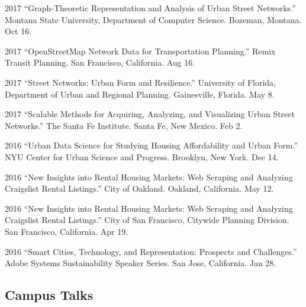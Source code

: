 \documentclass[12pt,letterpaper]{report}
\begin{document}
\begin{tablist}
        \item[2017] \tab \enquote{Graph-Theoretic Representation and Analysis of Urban Street Networks.} Montana State University, Department of Computer Science. Bozeman, Montana. Oct 16.

        \item[2017] \tab \enquote{OpenStreetMap Network Data for Transportation Planning.} Remix Transit Planning. San Francisco, California. Aug 16.

        \item[2017] \tab \enquote{Street Networks: Urban Form and Resilience.} University of Florida, Department of Urban and Regional Planning. Gainesville, Florida. May 8.

        \item[2017] \tab \enquote{Scalable Methods for Acquiring, Analyzing, and Visualizing Urban Street Networks.} The Santa Fe Institute. Santa Fe, New Mexico. Feb 2.

        \item[2016] \tab \enquote{Urban Data Science for Studying Housing Affordability and Urban Form.} NYU Center for Urban Science and Progress. Brooklyn, New York. Dec 14.

        \item[2016] \tab \enquote{New Insights into Rental Housing Markets: Web Scraping and Analyzing Craigslist Rental Listings.} City of Oakland. Oakland, California. May 12.

        \item[2016] \tab \enquote{New Insights into Rental Housing Markets: Web Scraping and Analyzing Craigslist Rental Listings.} City of San Francisco, Citywide Planning Division. San Francisco, California. Apr 19.

        \item[2016] \tab \enquote{Smart Cities, Technology, and Representation: Prospects and Challenges.} Adobe Systems Sustainability Speaker Series. San Jose, California. Jan 28.

    \end{tablist}

    \subsection*{Campus Talks}
\end{document}
